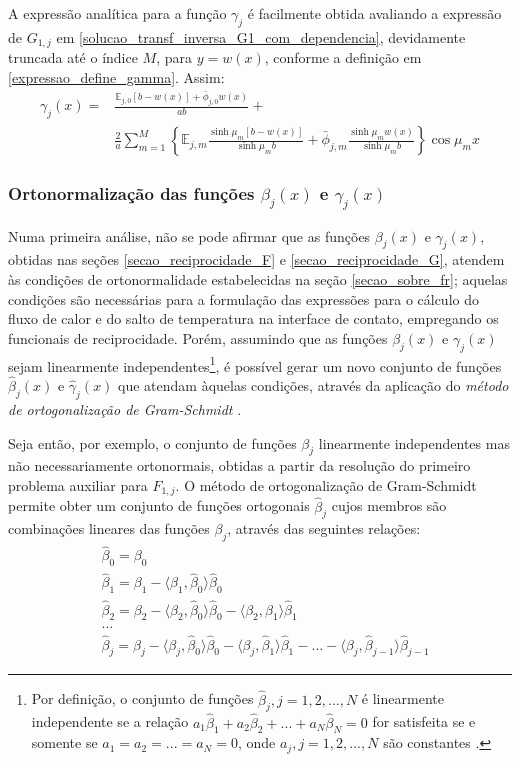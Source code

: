 A expressão analítica para a função $\gamma_j$ é facilmente obtida avaliando a expressão de $G_{1,j}$ em \eqref{solucao_transf_inversa_G1_com_dependencia}, devidamente truncada até o índice $M$, para $y = w(x)$, conforme a definição em \eqref{expressao_define_gamma}. Assim:
\begin{align}
\gamma_j(x) = & \frac{\mathbb{E}_{j,0}[b - w(x)] + \bar{\phi}_{j,0}w(x)}{ab} + \nonumber \\
&\frac{2}{a}\sum_{m=1}^M \left\lbrace\mathbb{E}_{j,m}\frac{\sinh\mu_m [b - w(x)]}{\sinh\mu_m b} + \bar{\phi}_{j, m}\frac{\sinh\mu_m w(x)}{\sinh\mu_m b}\right\rbrace \cos\mu_m x
\label{serie_para_gamma}
\end{align} 

\subsubsection{Ortonormalização das funções $\beta_j(x)$ e $\gamma_j(x)$}\label{orto_beta_gama}

Numa primeira análise, não se pode afirmar que as funções $\beta_j(x)$ e $\gamma_j(x)$, obtidas nas seções \ref{secao_reciprocidade_F} e \ref{secao_reciprocidade_G}, atendem às condições de ortonormalidade estabelecidas na seção \ref{secao_sobre_fr}; aquelas condições são necessárias para a formulação das expressões para o cálculo do fluxo de calor e do salto de temperatura na interface de contato, empregando os funcionais de reciprocidade. Porém, assumindo que as funções $\beta_j(x)$ e $\gamma_j(x)$ sejam linearmente independentes\footnote{Por definição, o conjunto de funções $\hat{\beta}_j, j = 1,2,...,N$ é linearmente independente se a relação $a_1\hat{\beta}_1 + a_2\hat{\beta}_2 + ... + a_N\hat{\beta}_N = 0$ for satisfeita se e somente se $a_1 = a_2 = ... = a_N = 0$, onde $a_j, j=1,2,...,N$ são constantes \citep{livro_axler}.}, é possível gerar um novo conjunto de funções $\hat{\beta}_j(x)$ e $\hat{\gamma}_j(x)$ que atendam àquelas condições, através da aplicação do \textit{método de ortogonalização de Gram-Schmidt} \citep{livro_axler}.

Seja então, por exemplo, o conjunto de funções $\beta_j$ linearmente independentes mas não necessariamente ortonormais, obtidas a partir da resolução do primeiro problema auxiliar para $F_{1,j}$. O método de ortogonalização de Gram-Schmidt permite obter um conjunto de funções ortogonais $\hat{\beta}_j$ cujos membros são combinações lineares das funções $\beta_j$, através das seguintes relações:
\begin{align}
& \hat{\beta}_0 = \beta_0 \\
& \hat{\beta}_1
=
\beta_1 - \langle \beta_1, \hat{\beta}_0\rangle\hat{\beta}_0 \\
& \hat{\beta}_2
=
\beta_2 - \langle \beta_2, \hat{\beta}_0\rangle\hat{\beta}_0 - \langle \beta_2, \hat{\beta}_1\rangle\hat{\beta}_1\\
& \ldots \nonumber \\
& \hat{\beta}_j
=
\beta_j - \langle \beta_j, \hat{\beta}_0\rangle\hat{\beta}_0 - \langle \beta_j, \hat{\beta}_1\rangle\hat{\beta}_1 - \ldots - \langle \beta_j, \hat{\beta}_{j - 1}\rangle\hat{\beta}_{j - 1}
\end{align}


